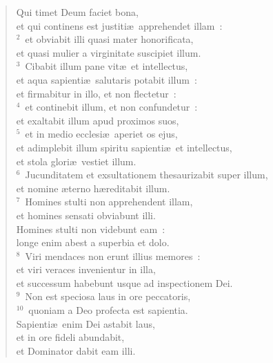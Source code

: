 \begin{flushleft}\begin{verse}\vspace{-19pt}\hspace{6pt}Qui timet Deum faciet bona,\\\hspace{6pt} et qui continens est justiti\ae\ apprehendet illam~:\\
${}^{2}$~et obviabit illi quasi mater honorificata,\\ et quasi mulier a virginitate suscipiet illum.\\
${}^{3}$~Cibabit illum pane vit\ae\ et intellectus,\\ et aqua sapienti\ae\ salutaris potabit illum~:\\ et firmabitur in illo, et non flectetur~:\\
${}^{4}$~et continebit illum, et non confundetur~:\\ et exaltabit illum apud proximos suos,\\
${}^{5}$~et in medio ecclesi\ae\ aperiet os ejus,\\ et adimplebit illum spiritu sapienti\ae\ et intellectus,\\ et stola glori\ae\ vestiet illum.\\
${}^{6}$~Jucunditatem et exsultationem thesaurizabit super illum,\\ et nomine \ae terno h\ae reditabit illum.\\
${}^{7}$~Homines stulti non apprehendent illam,\\ et homines sensati obviabunt illi.\\ Homines stulti non videbunt eam~:\\ longe enim abest a superbia et dolo.\\
${}^{8}$~Viri mendaces non erunt illius memores~:\\ et viri veraces invenientur in illa,\\ et successum habebunt usque ad inspectionem Dei.\\
${}^{9}$~Non est speciosa laus in ore peccatoris,\\
${}^{10}$~quoniam a Deo profecta est sapientia.\\ Sapienti\ae\ enim Dei astabit laus,\\ et in ore fideli abundabit,\\ et Dominator dabit eam illi.\end{verse}\end{flushleft}


